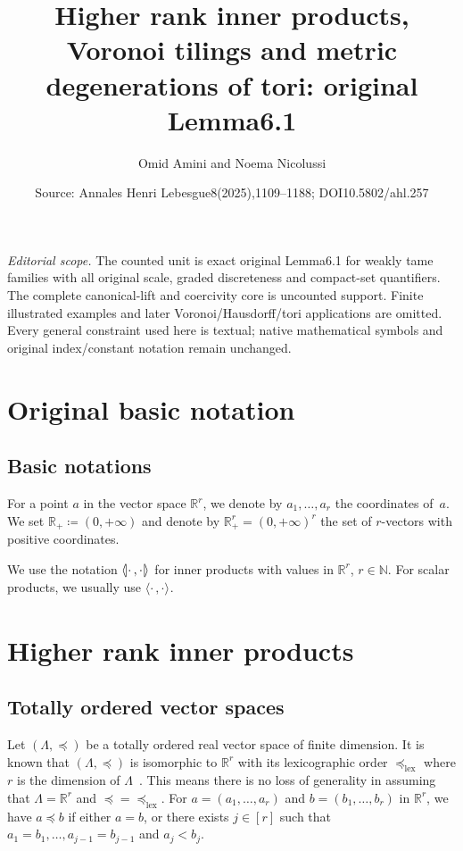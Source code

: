 \documentclass[10pt,a4paper]{amsart}
\title[Finite nearest sites in degenerations]{Higher rank inner products, Voronoi tilings and metric degenerations of tori: original Lemma6.1}
\author{Omid Amini and Noema Nicolussi}
\date{Source: Annales Henri Lebesgue8(2025),1109--1188; DOI10.5802/ahl.257}
\newcommand{\innone}[2]{{\langle#2\rangle_{#1}}}
\newcommand{\llangle}{\mathopen{\langle\mkern -3.1mu\lvert}}
\newcommand{\rrangle}{\mathclose{\rvert\mkern -3.1mu\rangle}}
\newcommand{\highinn}[2]{{\llangle#2\rrangle_{#1}}}
\newcommand{\R}{\mathbb{R}}
\newcommand{\N}{\mathbb{N}}
\newcommand{\lexeq}{\preceq_{\mathrm{lex}}}
\theoremstyle{definition}\newtheorem{defi}[cdrthm]{Definition}
\begin{document}
\maketitle
\noindent\textit{Editorial scope.} The counted unit is exact original Lemma6.1 for weakly tame families with all original scale, graded discreteness and compact-set quantifiers. The complete canonical-lift and coercivity core is uncounted support. Finite illustrated examples and later Voronoi/Hausdorff/tori applications are omitted. Every general constraint used here is textual; native mathematical symbols and original index/constant notation remain unchanged.
\section{Original basic notation}
\subsection*{Basic notations} \label{ss:BasicNotations}
For a point $a$ in the vector space $\R^r$, we denote by $a_1, \dots, a_r$ the coordinates of~$a$. We set $\R_+ \coloneqq (0, +\infty)$ and denote by $\R_+^r =(0,+\infty)^r$ the set of $r$-vectors with positive coordinates.


We use the notation $\highinn{}{\cdot\,,\cdot}$ for inner products with values in $\R^r$, $r\in \N$. For scalar products, we usually use $\innone{}{\cdot\,,\cdot}$.

\section{Higher rank inner products} \label{sec:HigherRankInnerProducts}

\subsection{Totally ordered vector spaces}



Let $(\Lambda, \preceq)$ be a totally ordered real vector space of finite dimension. It is known that $(\Lambda, \preceq)$ is isomorphic to $\R^r$ with its lexicographic order $\lexeq$ where $r$ is the dimension of $\Lambda$~\cite{Bir-Lattice, HW52}. This means there is no loss of generality in assuming that $\Lambda = \R^r$ and $\preceq =\lexeq$. For $a =(a_1, \dots, a_r)$ and $b=(b_1, \dots, b_r)$ in $\R^r$, we have $a \preceq b$ if either $a=b$, or there exists $j\in [r]$ such that $a_1=b_1, \dots, a_{j-1}=b_{j-1}$ and $a_j<b_j$.
\end{document}
